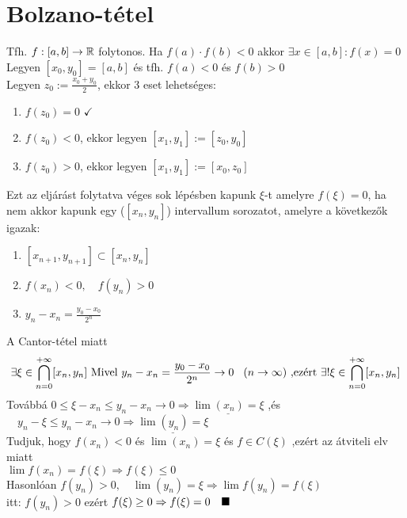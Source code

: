 \documentclass[a4paper,12pt]{article}
\begin{document}
\section{Bolzano-tétel}
\tetel Tfh. $f: [a,b] \to \mathbb{R}$ folytonos. Ha $f(a)\cdot f(b) < 0$ akkor
$\exists x \in [a,b]: f(x) = 0$\\[0.1cm]
\biz Legyen $ [x_0,y_0] = [a,b] $ és tfh. $f(a) < 0$ és $f(b) > 0 $\\[0.1cm] Legyen
$z_0 := \frac{x_0+y_0}{2}$, ekkor 3 eset lehetséges: 
\begin{enumerate}
	\item $f(z_0) = 0$ $\checkmark$
	\item $f(z_0) < 0$, ekkor legyen $[x_1,y_1] := [z_0,y_0]$
	\item $f(z_0) > 0$, ekkor legyen $[x_1,y_1] := [x_0,z_0]$
\end{enumerate}
Ezt az eljárást folytatva véges sok lépésben kapunk $\xi$-t amelyre $f(\xi) = 0$,
ha nem akkor kapunk egy ($[x_n,y_n]$) intervallum sorozatot, amelyre a következők
igazak:\newpage
\begin{enumerate}
	\item $[x_{n+1},y_{n+1}]\subset[x_n,y_n]$
	\item $f(x_n) < 0,\quad f(y_n) > 0$
	\item $y_n - x_n = \frac{y_0-x_0}{2^n}$
\end{enumerate}
A Cantor-tétel miatt \[ \exists\xi\in\bigcap_{n=0}^{+\infty}[x_n,y_n]\text{ Mivel }
y_n-x_n=\frac{y_0-x_0}{2^n}\to0\hspace*{0.3cm}(n\to\infty)\text{ ,ezért  }\exists!
\xi\in\bigcap_{n=0}^{+\infty}[x_n,y_n] \]
Továbbá $0\leq\xi-x_n\leq y_n-x_n\to0\Rightarrow\underline{\lim(x_n)=\xi}$ ,és
$\quad y_n-\xi\leq y_n-x_n\to0\Rightarrow\underline{\lim(y_n)=\xi}$\\[0.2cm]
Tudjuk, hogy $f(x_n)<0$ és $\lim(x_n)=\xi$ és $f\in C(\xi)$ ,ezért az átviteli elv
miatt\\ $\lim f(x_n)=f(\xi)\Rightarrow f(\xi)\leq0$\\[0.1cm] Hasonlóan $f(y_n)>0,
\quad\lim(y_n)=\xi\Rightarrow\lim f(y_n)=f(\xi)$\\itt: $f(y_n)>0$ ezért $f(\xi)
\geq0\Rightarrow f(\xi)=0\quad\blacksquare$
\end{document}
